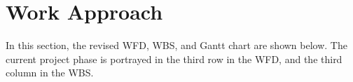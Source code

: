 \section{Work Approach}
\label{sec:work_appr}
In this section, the revised WFD, WBS, and Gantt chart are shown below. The current project phase is portrayed in the third row in the WFD, and the third column in the WBS. 

\newpage



\newpage



\newpage

%

%

%

